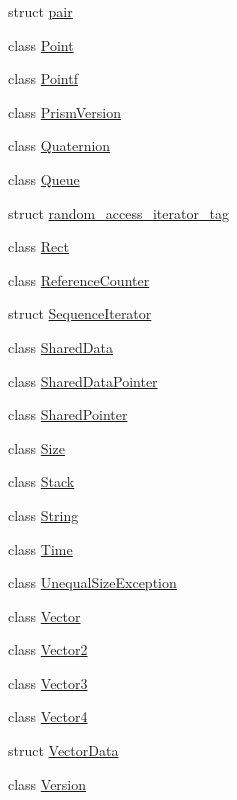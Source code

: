 \begin{DoxyCompactItemize}
\item 
struct \hyperlink{structprism_1_1pair}{pair}
\item 
class \hyperlink{classprism_1_1_point}{Point}
\item 
class \hyperlink{classprism_1_1_pointf}{Pointf}
\item 
class \hyperlink{classprism_1_1_prism_version}{Prism\+Version}
\item 
class \hyperlink{classprism_1_1_quaternion}{Quaternion}
\item 
class \hyperlink{classprism_1_1_queue}{Queue}
\item 
struct \hyperlink{structprism_1_1random__access__iterator__tag}{random\+\_\+access\+\_\+iterator\+\_\+tag}
\item 
class \hyperlink{classprism_1_1_rect}{Rect}
\item 
class \hyperlink{classprism_1_1_reference_counter}{Reference\+Counter}
\item 
struct \hyperlink{structprism_1_1_sequence_iterator}{Sequence\+Iterator}
\item 
class \hyperlink{classprism_1_1_shared_data}{Shared\+Data}
\item 
class \hyperlink{classprism_1_1_shared_data_pointer}{Shared\+Data\+Pointer}
\item 
class \hyperlink{classprism_1_1_shared_pointer}{Shared\+Pointer}
\item 
class \hyperlink{classprism_1_1_size}{Size}
\item 
class \hyperlink{classprism_1_1_stack}{Stack}
\item 
class \hyperlink{classprism_1_1_string}{String}
\item 
class \hyperlink{classprism_1_1_time}{Time}
\item 
class \hyperlink{classprism_1_1_unequal_size_exception}{Unequal\+Size\+Exception}
\item 
class \hyperlink{classprism_1_1_vector}{Vector}
\item 
class \hyperlink{classprism_1_1_vector2}{Vector2}
\item 
class \hyperlink{classprism_1_1_vector3}{Vector3}
\item 
class \hyperlink{classprism_1_1_vector4}{Vector4}
\item 
struct \hyperlink{structprism_1_1_vector_data}{Vector\+Data}
\item 
class \hyperlink{classprism_1_1_version}{Version}
\end{DoxyCompactItemize}

